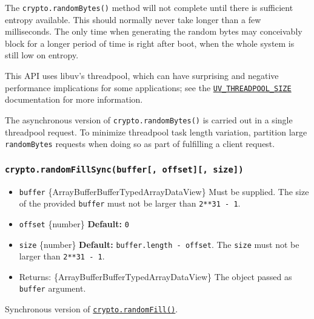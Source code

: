 The \texttt{crypto.randomBytes()} method will not complete until there
is sufficient entropy available. This should normally never take longer
than a few milliseconds. The only time when generating the random bytes
may conceivably block for a longer period of time is right after boot,
when the whole system is still low on entropy.

This API uses libuv's threadpool, which can have surprising and negative
performance implications for some applications; see the
\href{cli.md\#uv_threadpool_sizesize}{\texttt{UV\_THREADPOOL\_SIZE}}
documentation for more information.

The asynchronous version of \texttt{crypto.randomBytes()} is carried out
in a single threadpool request. To minimize threadpool task length
variation, partition large \texttt{randomBytes} requests when doing so
as part of fulfilling a client request.

\subsubsection{\texorpdfstring{\texttt{crypto.randomFillSync(buffer{[},\ offset{]}{[},\ size{]})}}{crypto.randomFillSync(buffer{[}, offset{]}{[}, size{]})}}\label{crypto.randomfillsyncbuffer-offset-size}

\begin{itemize}
\tightlist
\item
  \texttt{buffer}
  \{ArrayBuffer\textbar Buffer\textbar TypedArray\textbar DataView\}
  Must be supplied. The size of the provided \texttt{buffer} must not be
  larger than \texttt{2**31\ -\ 1}.
\item
  \texttt{offset} \{number\} \textbf{Default:} \texttt{0}
\item
  \texttt{size} \{number\} \textbf{Default:}
  \texttt{buffer.length\ -\ offset}. The \texttt{size} must not be
  larger than \texttt{2**31\ -\ 1}.
\item
  Returns:
  \{ArrayBuffer\textbar Buffer\textbar TypedArray\textbar DataView\} The
  object passed as \texttt{buffer} argument.
\end{itemize}

Synchronous version of
\hyperref[cryptorandomfillbuffer-offset-size-callback]{\texttt{crypto.randomFill()}}.

